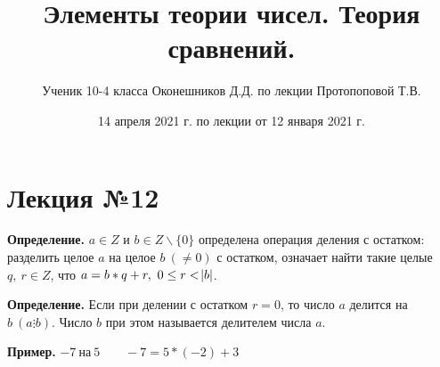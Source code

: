 \documentclass{article}
\begin{document}

  \title{Элементы теории чисел. Теория сравнений.}
  \author{Ученик 10-4 класса Оконешников Д.Д. по лекции Протопоповой Т.В.}
  \date{14 апреля 2021 г. по лекции от 12 января 2021 г.}
  \maketitle

  \section{Лекция №12}
  
  \textbf{Определение.} \( a \in Z \) и \( b \in Z \backslash \{0\} \) определена операция деления с остатком: разделить целое \( a \) на целое \(b\ (\neq 0) \) с остатком, 
  означает найти такие целые \( q,\ r \in Z \), что \(a=b*q+r,\ 0 \leq r < \abs{b} \).

  \textbf{Определение.} Если при делении с остатком \( r = 0 \), то число \( a \) делится на \( b\ (a \vdots b) \). Число \( b \) при этом называется делителем числа \( a \).

  \textbf{Пример.} \( -7\ \textrm{на}\ 5 \qquad -7 = 5*(-2)+3 \)
\end{document}
